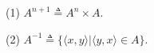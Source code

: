 (1) $A^{n+1} \triangleq A^n \times A$.

(2) $A^{-1} \triangleq \{\langle x, y \rangle | \langle y, x \rangle \in A\}$.

